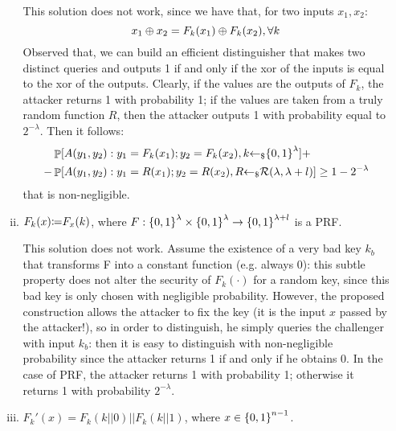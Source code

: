 \begin{enumerate}[(a)]
\begin{enumerate}[(i)]
		            \begin{solution}
			            This solution does not work, since we have that, for two inputs $x_1, x_2$:
			            \[x_1 \oplus x_2 = F_k(x_1) \oplus F_k(x_2), \forall k\]
			            Observed that, we can build an efficient distinguisher that makes two distinct queries and outputs 1 if and only if the xor of the inputs is equal to the xor of the outputs. Clearly, if the values are the outputs of $F_k$, the attacker returns 1 with probability 1; if the values are taken from a truly random function $R$, then the attacker outputs 1 with probability equal to $2^{-\lambda}$.
			            Then it follows:
			            \begin{align*}
				              & \mathop{\mathbb P}[A(y_1, y_2): y_1 = F_k(x_1); y_2 = F_k(x_2), k {\leftarrow_\$} {\{0, 1\}}^\lambda] +                                    \\
				            - & \mathop{\mathbb P}[A(y_1, y_2): y_1 = R(x_1); y_2 = R(x_2), R {\leftarrow_\$} \mathcal{R}(\lambda, \lambda + l)] \ge 1 - 2^{-\lambda}
			            \end{align*}
			            that is non-negligible.
		            \end{solution}

		      \item $F_k(x) {\coloneqq} F_x(k)$, where $F: {\{0, 1\}}^\lambda \times {\{0, 1\}}^\lambda \to {\{0, 1\}}^{\lambda + l}$ is a PRF.

		            \begin{solution}
			            This solution does not work. Assume the existence of a very bad key $k_b$ that transforms F into a constant function (e.g. always 0): this subtle property does not alter the security of $F_k(\cdot)$ for a random key, since this bad key is only chosen with negligible probability. However, the proposed construction allows the attacker to fix the key (it is the input $x$ passed by the attacker!), so in order to distinguish, he simply queries the challenger with input $k_b$: then it is easy to distinguish with non-negligible probability since the attacker returns 1 if and only if he obtains 0. In the case of PRF, the attacker returns 1 with probability 1; otherwise it returns 1 with probability $2^{-\lambda}$.
		            \end{solution}

		      \item $F_k'(x) = F_k(k||0) || F_k(k||1)$, where $x \in {\{0, 1\}}^{n - 1}$.


\end{enumerate}
\end{enumerate}
